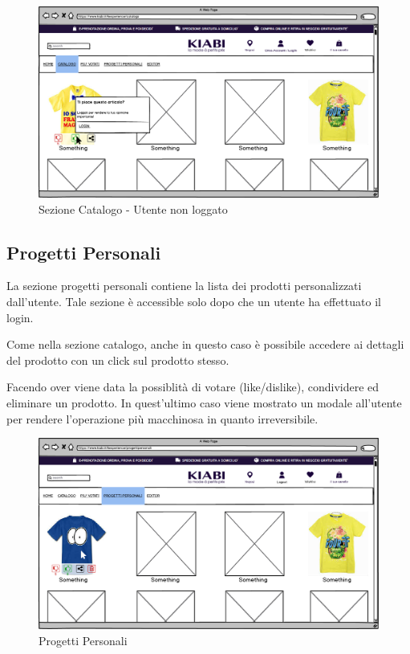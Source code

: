 \documentclass[12pt,italian,]{report}
\begin{document}
\begin{figure}[h]
\centering
\includegraphics{../../balsamiq/balsamiq_finale/Catalogologin.png}
\caption{Sezione Catalogo - Utente non loggato}
\label{catalogo_non_loggato}
\end{figure}
\clearpage

\newpage
\subsection{Progetti Personali} 

La sezione progetti personali contiene la lista dei prodotti personalizzati dall'utente. Tale sezione è accessible solo dopo che un utente ha effettuato il login.

Come nella sezione catalogo, anche in questo caso è possibile accedere ai dettagli del prodotto con un click sul prodotto stesso.

Facendo over viene data la possiblità di votare (like/dislike), condividere ed eliminare un prodotto. In quest'ultimo caso viene mostrato un modale all'utente per rendere l'operazione più macchinosa in quanto irreversibile.

\begin{figure}[h]
\centering
\includegraphics{../../balsamiq/balsamiq_finale/ProgettiPersonali.png}
\caption{Progetti Personali}
\label{progetti_personali}
\end{figure}
\end{document}
